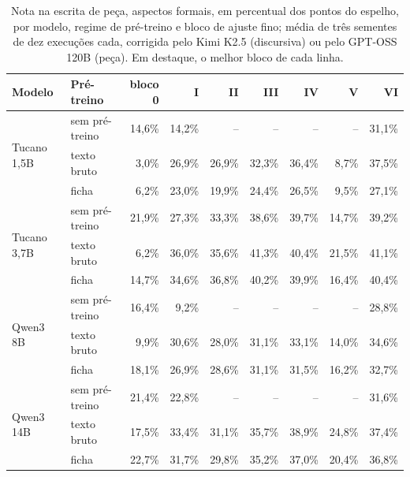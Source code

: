 \documentclass{IOS-Book-Article}
\begin{document}
\begin{table}[!ht]
\centering
\caption{Nota na escrita de peça, aspectos formais, em percentual dos pontos do espelho, por modelo, regime de pré-treino e bloco de ajuste fino; média de três sementes de dez execuções cada, corrigida pelo Kimi K2.5 (discursiva) ou pelo GPT-OSS 120B (peça). Em destaque, o melhor bloco de cada linha.}
\footnotesize\setlength{\tabcolsep}{3pt}
\begin{tabular}{llrrrrrrr}
\hline
\textbf{Modelo} & \textbf{Pré-treino} & \textbf{bloco 0} & \textbf{I} & \textbf{II} & \textbf{III} & \textbf{IV} & \textbf{V} & \textbf{VI} \\
\hline
\multirow{3}{*}{Tucano 1,5B} & sem pré-treino & 14,6\% & 14,2\% & -- & -- & -- & -- & 31,1\% \\
 & texto bruto & 3,0\% & 26,9\% & 26,9\% & 32,3\% & 36,4\% & 8,7\% & 37,5\% \\
 & ficha & 6,2\% & 23,0\% & 19,9\% & 24,4\% & 26,5\% & 9,5\% & 27,1\% \\
\multirow{3}{*}{Tucano 3,7B} & sem pré-treino & 21,9\% & 27,3\% & 33,3\% & 38,6\% & 39,7\% & 14,7\% & 39,2\% \\
 & texto bruto & 6,2\% & 36,0\% & 35,6\% & 41,3\% & 40,4\% & 21,5\% & 41,1\% \\
 & ficha & 14,7\% & 34,6\% & 36,8\% & 40,2\% & 39,9\% & 16,4\% & 40,4\% \\
\multirow{3}{*}{Qwen3 8B} & sem pré-treino & 16,4\% & 9,2\% & -- & -- & -- & -- & 28,8\% \\
 & texto bruto & 9,9\% & 30,6\% & 28,0\% & 31,1\% & 33,1\% & 14,0\% & 34,6\% \\
 & ficha & 18,1\% & 26,9\% & 28,6\% & 31,1\% & 31,5\% & 16,2\% & 32,7\% \\
\multirow{3}{*}{Qwen3 14B} & sem pré-treino & 21,4\% & 22,8\% & -- & -- & -- & -- & 31,6\% \\
 & texto bruto & 17,5\% & 33,4\% & 31,1\% & 35,7\% & 38,9\% & 24,8\% & 37,4\% \\
 & ficha & 22,7\% & 31,7\% & 29,8\% & 35,2\% & 37,0\% & 20,4\% & 36,8\% \\
\hline
\end{tabular}
\end{table}
\end{document}
